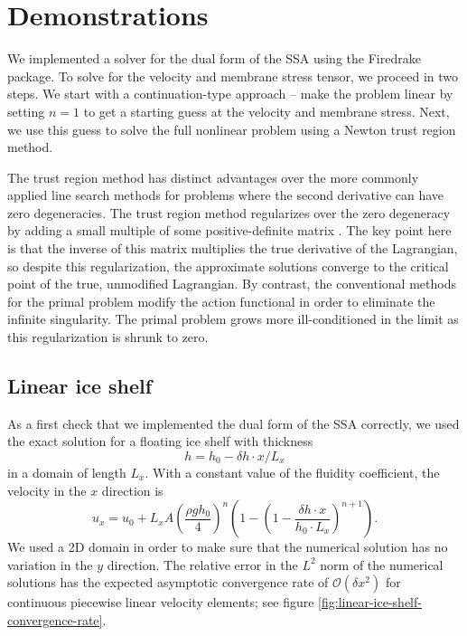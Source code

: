 \documentclass{article}
\theoremstyle{definition}
\theoremstyle{plain}
\begin{document}
\section{Demonstrations}

We implemented a solver for the dual form of the SSA using the Firedrake package.
To solve for the velocity and membrane stress tensor, we proceed in two steps.
We start with a continuation-type approach -- make the problem linear by setting $n = 1$ to get a starting guess at the velocity and membrane stress.
Next, we use this guess to solve the full nonlinear problem using a Newton trust region method.

The trust region method has distinct advantages over the more commonly applied line search methods for problems where the second derivative can have zero degeneracies.
The trust region method regularizes over the zero degeneracy by adding a small multiple of some positive-definite matrix \citep{conn2000trust}.
The key point here is that the inverse of this matrix multiplies the true derivative of the Lagrangian, so despite this regularization, the approximate solutions converge to the critical point of the true, unmodified Lagrangian.
By contrast, the conventional methods for the primal problem modify the action functional in order to eliminate the infinite singularity.
The primal problem grows more ill-conditioned in the limit as this regularization is shrunk to zero.

\subsection{Linear ice shelf}


As a first check that we implemented the dual form of the SSA correctly, we used the exact solution for a floating ice shelf with thickness
\begin{equation}
    h = h_0 - \delta h \cdot x / L_x
\end{equation}
in a domain of length $L_x$.
With a constant value of the fluidity coefficient, the velocity in the $x$ direction is
\begin{equation}
    u_x = u_0 + L_x A \left(\frac{\rho g h_0}{4}\right)^n\left(1 - \left(1 - \frac{\delta h \cdot x}{h_0\cdot L_x}\right)^{n + 1}\right).
\end{equation}
We used a 2D domain in order to make sure that the numerical solution has no variation in the $y$ direction.
The relative error in the $L^2$ norm of the numerical solutions has the expected asymptotic convergence rate of $\mathscr{O}(\delta x^2)$ for continuous piecewise linear velocity elements; see figure \ref{fig:linear-ice-shelf-convergence-rate}.
\end{document}

